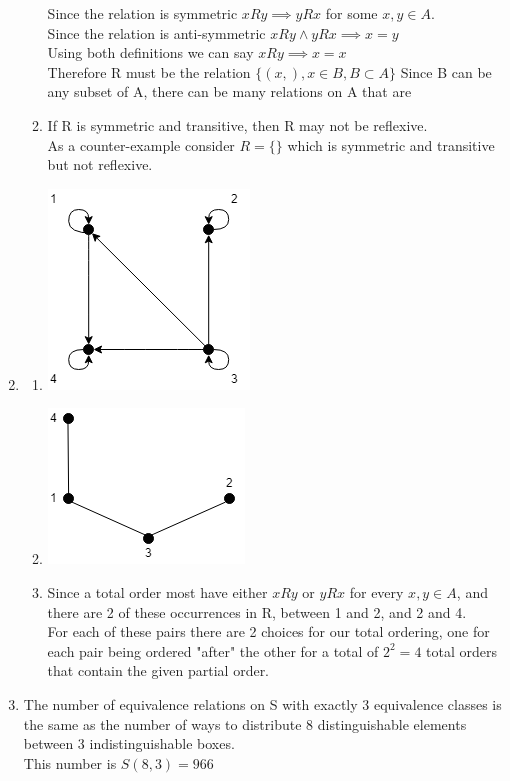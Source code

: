 \documentclass[11pt]{article}
\begin{document}
\begin{enumerate}[]
\begin{enumerate}[label=\alph*]
	Since the relation is symmetric $xRy \implies yRx$ for some $x,y\in A$.\\
	Since the relation is anti-symmetric $xRy \land yRx \implies x=y$\\
	Using both definitions we can say $xRy\implies x=x$\\
	Therefore R must be the relation $\{(x,), x \in B, B\subset A\}$
	Since B can be any subset of A, there can be many relations on A that are 
	\item
	If R is symmetric and transitive, then R may not be reflexive.\\
	As a counter-example consider $R=\{\}$ which is symmetric and transitive but not reflexive.
	\end{enumerate}
\item
	\begin{enumerate}[label=\alph*]
	\item \mbox{}
	\begin{center}
		\includegraphics[scale=0.5]{7a-digraph.png}\\
	\end{center}
	\item \mbox{}
	\begin{center}
		\includegraphics[scale=0.5]{7b-hasse-diagram.png}\\
	\end{center}
	\item Since a total order most have either $xRy$ or $yRx$ for every $x,y\in A$, and there are 2 of these occurrences in R, between 1 and 2, and 2 and 4.\\
	For each of these pairs there are 2 choices for our total ordering, one for each pair being ordered "after" the other for a total of $2^2=4$ total orders that contain the given partial order.
	\end{enumerate}
\item The number of equivalence relations on S with exactly 3 equivalence classes is the same as the number of ways to distribute 8 distinguishable elements between 3 indistinguishable boxes.\\
This number is $S(8,3)=966$
\end{enumerate}
\end{document}
